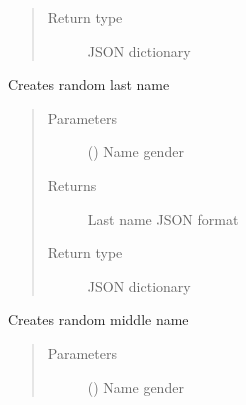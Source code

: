 \documentclass[letterpaper,10pt,english]{sphinxmanual}
\begin{document}
\begin{fulllineitems}
\begin{fulllineitems}
\begin{quote}
\begin{description}
\item[{Return type}] \leavevmode
\sphinxAtStartPar
JSON dictionary

\end{description}\end{quote}

\end{fulllineitems}


\begin{fulllineitems}
\label{\detokenize{CE_app.synth_phr:CE_app.synth_phr.functions.Domains.last_name}}
\sphinxAtStartPar
Creates random last name
\begin{quote}\begin{description}
\item[{Parameters}] \leavevmode
\sphinxAtStartPar
{} () \textendash{} Name gender

\item[{Returns}] \leavevmode
\sphinxAtStartPar
Last name JSON format

\item[{Return type}] \leavevmode
\sphinxAtStartPar
JSON dictionary

\end{description}\end{quote}

\end{fulllineitems}


\begin{fulllineitems}
\label{\detokenize{CE_app.synth_phr:CE_app.synth_phr.functions.Domains.middle_name}}
\sphinxAtStartPar
Creates random middle name
\begin{quote}\begin{description}
\item[{Parameters}] \leavevmode
\sphinxAtStartPar
{} () \textendash{} Name gender


\end{description}
\end{quote}
\end{fulllineitems}
\end{fulllineitems}
\end{document}
